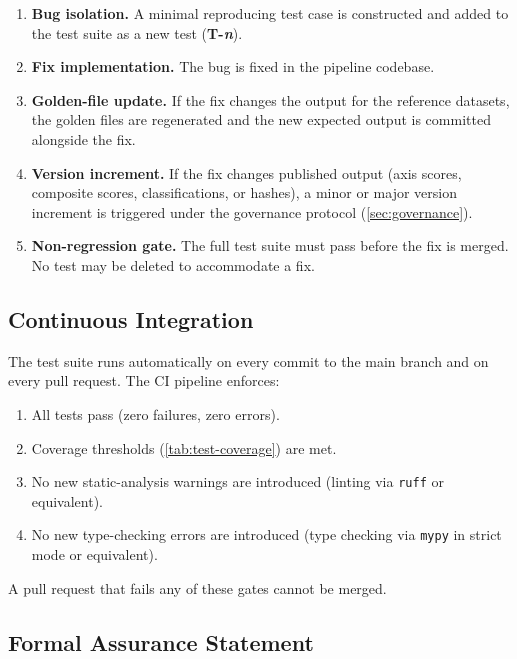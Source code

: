 \begin{enumerate}
  \item \textbf{Bug isolation.}  A minimal reproducing test case is
    constructed and added to the test suite as a new test
    (\textbf{T-\textit{n}}).
  \item \textbf{Fix implementation.}  The bug is fixed in the pipeline
    codebase.
  \item \textbf{Golden-file update.}  If the fix changes the output for the
    reference datasets, the golden files are regenerated and the new expected
    output is committed alongside the fix.
  \item \textbf{Version increment.}  If the fix changes published output
    (axis scores, composite scores, classifications, or hashes), a minor or
    major version increment is triggered under the governance protocol
    (\cref{sec:governance}).
  \item \textbf{Non-regression gate.}  The full test suite must pass before
    the fix is merged.  No test may be deleted to accommodate a fix.
\end{enumerate}

\subsection{Continuous Integration}\label{sec:test:ci}

The test suite runs automatically on every commit to the main branch and on
every pull request.  The CI pipeline enforces:

\begin{enumerate}
  \item All tests pass (zero failures, zero errors).
  \item Coverage thresholds (\cref{tab:test-coverage}) are met.
  \item No new static-analysis warnings are introduced (linting via
    \texttt{ruff} or equivalent).
  \item No new type-checking errors are introduced (type checking via
    \texttt{mypy} in strict mode or equivalent).
\end{enumerate}

A pull request that fails any of these gates cannot be merged.

\subsection{Formal Assurance Statement}\label{sec:test:assurance}

